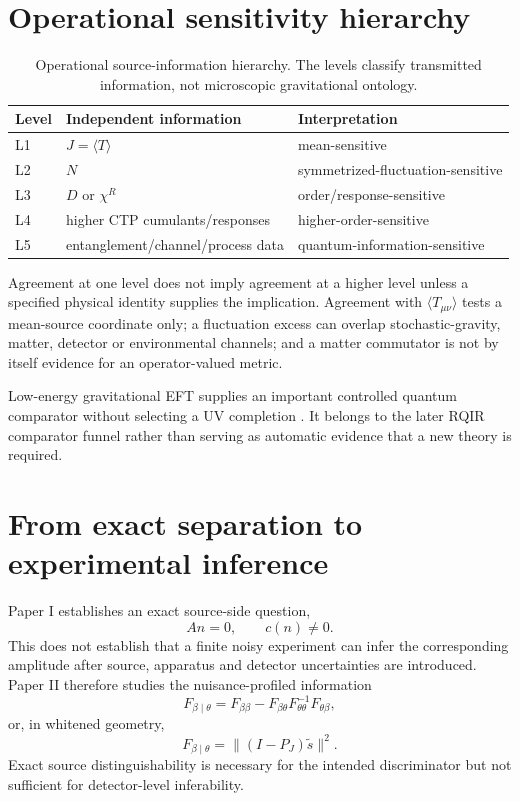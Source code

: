 \documentclass[12pt]{article}
\begin{document}
\section{Operational sensitivity hierarchy}

\begin{table}[ht]
\centering
\caption{Operational source-information hierarchy. The levels classify transmitted information, not microscopic gravitational ontology.}
\label{tab:hierarchy}
\begin{tabular}{@{}lll@{}}
\toprule
Level & Independent information & Interpretation \\
\midrule
L1 & $J=\langle T\rangle$ & mean-sensitive \\
L2 & $N$ & symmetrized-fluctuation-sensitive \\
L3 & $D$ or $\chi^R$ & order/response-sensitive \\
L4 & higher CTP cumulants/responses & higher-order-sensitive \\
L5 & entanglement/channel/process data & quantum-information-sensitive \\
\bottomrule
\end{tabular}
\end{table}

Agreement at one level does not imply agreement at a higher level unless a specified physical identity supplies the implication. Agreement with $\langle T_{\mu\nu}\rangle$ tests a mean-source coordinate only; a fluctuation excess can overlap stochastic-gravity, matter, detector or environmental channels; and a matter commutator is not by itself evidence for an operator-valued metric.

Low-energy gravitational EFT supplies an important controlled quantum comparator without selecting a UV completion \cite{Donoghue1994}. It belongs to the later RQIR comparator funnel rather than serving as automatic evidence that a new theory is required.

\section{From exact separation to experimental inference}

Paper I establishes an exact source-side question,
\begin{equation}
 An=0,\qquad c(n)\neq0.
\end{equation}
This does not establish that a finite noisy experiment can infer the corresponding amplitude after source, apparatus and detector uncertainties are introduced. Paper II therefore studies the nuisance-profiled information
\begin{equation}
 F_{\beta\mid\theta}=F_{\beta\beta}
 -F_{\beta\theta}F_{\theta\theta}^{-1}F_{\theta\beta},
\end{equation}
or, in whitened geometry,
\begin{equation}
 F_{\beta\mid\theta}=\lVert(I-P_J)\tilde s\rVert^2.
\end{equation}
Exact source distinguishability is necessary for the intended discriminator but not sufficient for detector-level inferability.
\end{document}
